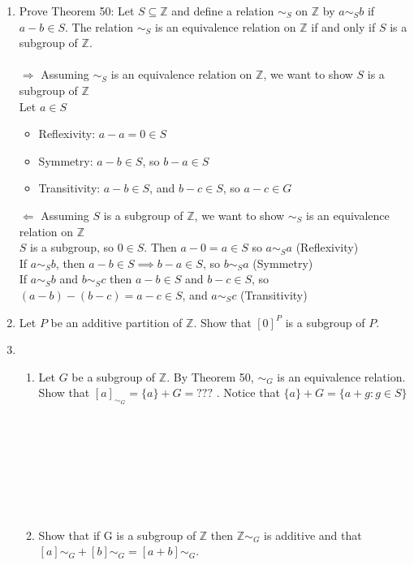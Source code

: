 \documentclass[11pt]{article}
\begin{document}
\begin{enumerate}
\newpage %
\item Prove Theorem 50: Let $S \subseteq \mathbb{Z}$ and define a relation $\sim_S$ on $\mathbb{Z}$ by $a \sim_S b$ if $a-b \in S$.  The relation $\sim_S$ is an equivalence relation on $\mathbb{Z}$ if and only if $S$ is a subgroup of $\mathbb{Z}$.\\
\\
$\Rightarrow$ Assuming $\sim_S$ is an equivalence relation on $\mathbb{Z}$, we want to show $S$ is a subgroup of $\mathbb{Z}$
\\
Let $a \in S$
\begin{itemize}
\item Reflexivity: $a -a = 0 \in S$
\item Symmetry: $a - b \in S$, so $b -a \in S$
\item Transitivity: $a - b \in S$, and $b -c \in S$, so $a - c \in G$
\end{itemize}
$\Leftarrow$ Assuming $S$ is a subgroup of $\mathbb{Z}$, we want to show $\sim_S$ is an equivalence relation on $\mathbb{Z}$
\\
$S$ is a subgroup, so $0 \in S$.  Then $a - 0 = a \in S$ so $a \sim_S a$ (Reflexivity)
\\
If $a \sim_S b$, then $a - b \in S \implies b -a \in S$, so $b \sim_S a$ (Symmetry)
\\
If $a \sim_S b$ and $b \sim_S c$ then $a -b \in S$ and $b -c \in S$, so $(a -b) - (b -c) = a -c \in S$, and $a \sim_S c$ (Transitivity)
\newpage %
\item Let $P$ be an additive partition of $\mathbb{Z}$. Show that $[0]^P$ is a subgroup of $P$.


\newpage %
\item
\begin{enumerate}
\item Let $G$ be a subgroup of $\mathbb{Z}$. By Theorem 50, $\sim_G$ is an equivalence relation. Show that $[a]_{\sim_G} = \{a\}+G = ???$ . Notice that $\{a\} + G = \{a + g : g \in S\}$
\\
\\
\\
\\
\\
\\
\\
\\

\item Show that if G is a subgroup of $\mathbb{Z}$ then $\mathbb{Z}\sim_G$ is additive and that $[a]\sim_G + [b]\sim_G = [a + b]\sim_G$.
\\
\\
\\
\\
\\
\\
\\

\end{enumerate}


\end{enumerate} %
\end{document}
